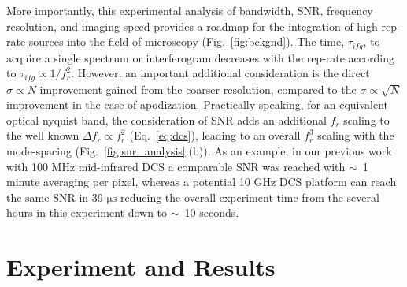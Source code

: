 \documentclass[aip,preprint]{revtex4-1}
\begin{document}
More importantly, this experimental analysis of bandwidth, SNR, frequency resolution, and imaging speed provides a roadmap for the integration of high rep-rate sources into the field of microscopy (\mbox{Fig. \ref{fig:bckgnd}}). The time, $\tau_{ifg}$, to acquire a single spectrum or interferogram decreases with the rep-rate according to $\tau_{ifg} \propto 1 / f_r^2$. However, an important additional consideration is the direct $\sigma \propto N$ improvement gained from the coarser resolution, compared to the $\sigma \propto \sqrt{N}$ improvement in the case of apodization. Practically speaking, for an equivalent optical nyquist band, the consideration of SNR adds an additional $f_r$ scaling to the well known $\Delta f_r \propto f_r^2$ (\mbox{Eq. \ref{eq:dcs}}), leading to an overall $f_r^3$ scaling with the mode-spacing (\mbox{Fig. \ref{fig:snr_analysis}.(b)}). As an example, in our previous work with 100 MHz mid-infrared DCS \cite{lindMidInfraredFrequencyComb2020,timmersMolecularFingerprintingBright2018} a comparable SNR was reached with \mbox{$\sim$ 1} minute averaging per pixel, whereas a potential 10 GHz DCS platform can reach the same SNR in 39 $\mathrm{\mu s}$ reducing the overall experiment time from the several hours in this experiment down to \mbox{$\sim$ 10} seconds.


\section{Experiment and Results}

\end{document}
